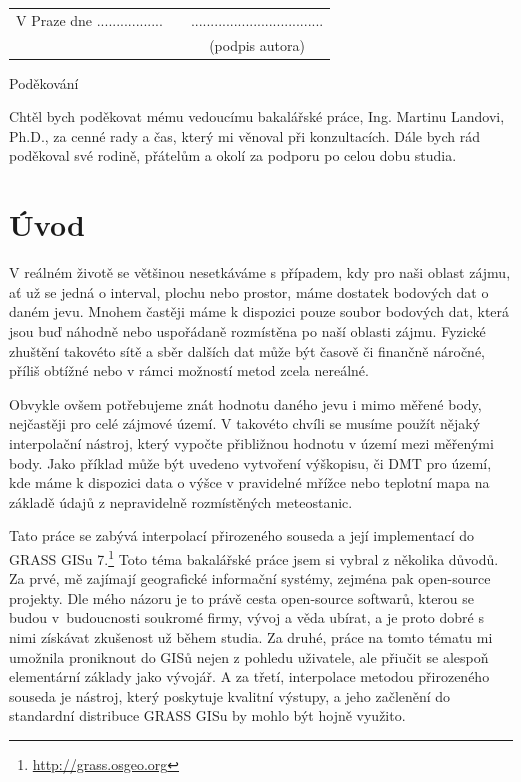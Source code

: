 \documentclass[12pt,a4paper]{article}
\newcommand{\necislovana}[1]{%
\phantomsection
\addcontentsline{toc}{section}{#1}



\section*{#1}
\markboth{\uppercase{#1}}{}
}
\begin{document}
\begin{flushleft}
\begin{tabular}{cp{}c}
V Praze dne .................
& 
&
..................................
\\
&&
(podpis autora)
\end{tabular}

\end{flushleft}
\newpage

\odsaditodzhora
\noindent Poděkování

Chtěl bych poděkovat mému vedoucímu bakalářské práce, Ing. Martinu Landovi, Ph.D., za 
cenné rady a čas, který mi věnoval při konzultacích. Dále bych rád poděkoval své rodině, přátelům a okolí za podporu po celou dobu studia.

\newpage
\tableofcontents

\newpage
\pagestyle{fancy}

\necislovana{Úvod}
V reálném životě se většinou nesetkáváme s případem, kdy pro naši oblast zájmu, ať už se jedná o interval, plochu nebo prostor, máme dostatek bodových dat o daném jevu. Mnohem častěji máme k dispozici pouze soubor bodových dat, která jsou buď náhodně nebo uspořádaně rozmístěna po naší oblasti zájmu. Fyzické zhuštění takovéto sítě a sběr dalších dat může být časově či finančně náročné, příliš obtížné nebo v rámci možností metod zcela nereálné.

Obvykle ovšem potřebujeme znát hodnotu daného jevu i mimo měřené body, nejčastěji pro celé zájmové území. V takovéto chvíli se musíme použít nějaký interpolační nástroj, který vypočte přibližnou hodnotu v území mezi měřenými body. Jako příklad může být uvedeno vytvoření výškopisu, či DMT pro území, kde máme k dispozici data o výšce v pravidelné mřížce nebo teplotní mapa na základě údajů z nepravidelně rozmístěných meteostanic.

\bigskip
Tato práce se zabývá interpolací přirozeného souseda a její implementací do GRASS GISu 7.\footnote{\url{http://grass.osgeo.org}} Toto téma bakalářské práce jsem si vybral z několika důvodů. Za prvé, mě zajímají geografické informační systémy, zejména pak open-source projekty. Dle mého názoru je to právě cesta open-source softwarů, kterou se budou v~budoucnosti soukromé firmy, vývoj a věda ubírat, a je proto dobré s nimi získávat zkušenost už během studia. Za druhé, práce na tomto tématu mi umožnila proniknout do GISů nejen z pohledu uživatele, ale přiučit se alespoň elementární základy jako vývojář. A za třetí, interpolace metodou přirozeného souseda je nástroj, který poskytuje kvalitní výstupy, a jeho začlenění do standardní distribuce GRASS GISu by mohlo být hojně využito.
\end{document}
